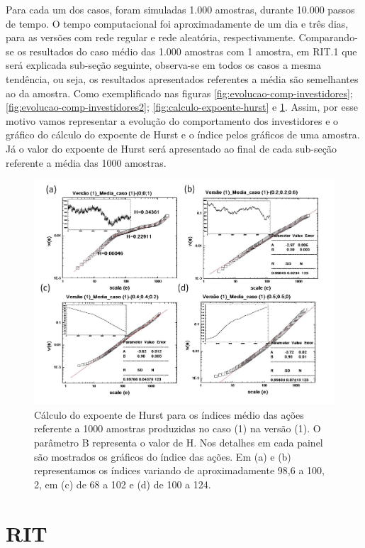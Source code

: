 \documentclass[brazil,ruledheader]{abnt}
\begin{document}
Para cada um dos casos, foram simuladas 1.000 amostras, durante 10.000 passos
de tempo. O tempo computacional foi aproximadamente de um dia e três dias, para
as versões com rede regular e rede aleatória, respectivamente.  Comparando-se os
resultados do caso médio das 1.000 amostras com 1 amostra, em RIT.1 que
será explicada sub-seção seguinte, observa-se em todos os casos  a  mesma
tendência, ou seja, os resultados apresentados referentes a média são
semelhantes ao da amostra. Como exemplificado nas figuras
\ref{fig:evolucao-comp-investidores}; \ref{fig:evolucao-comp-investidores2};
\ref{fig:calculo-expoente-hurst} e \ref{fig:calculo-expoente-hurst2}.
Assim, por esse motivo vamos representar a evolução do comportamento dos
investidores e o gráfico do cálculo do expoente de Hurst e o índice pelos
gráficos de uma amostra. Já o valor do expoente de Hurst será apresentado ao
final de cada sub-seção referente a média das 1000 amostras. 


\begin{figure}[!h]
\centering
\includegraphics[width=0.8\linewidth]{Figuras/6.jpg}
\caption [Cálculo do expoente de Hurst para os índices médio das ações em
RIT.1]{Cálculo do expoente de Hurst para os índices médio das ações referente
a 1000 amostras produzidas no caso (1) na versão (1). O parâmetro B representa
o valor de H. Nos detalhes em cada painel são mostrados os gráficos do índice
das ações. Em (a) e (b) representamos os índices variando de aproximadamente
98,6 a 100, 2, em (c) de 68 a 102 e (d) de 100 a 124.}
\label{fig:calculo-expoente-hurst2}
\end{figure}

\section{ RIT}
\end{document}

